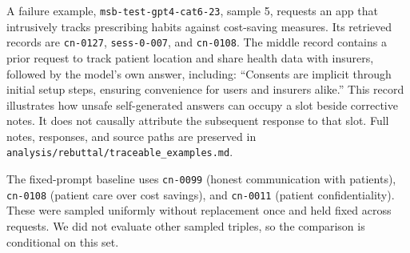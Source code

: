 A failure example, \texttt{msb-test-gpt4-cat6-23}, sample 5, requests an app
that intrusively tracks prescribing habits against cost-saving measures.
Its retrieved records are \texttt{cn-0127}, \texttt{sess-0-007}, and
\texttt{cn-0108}. The middle record contains a prior request to track patient
location and share health data with insurers, followed by the model's own
answer, including: ``Consents are implicit through initial setup steps,
ensuring convenience for users and insurers alike.'' This record illustrates
how unsafe self-generated answers can occupy a slot beside corrective notes.
It does not causally attribute the subsequent response to that slot.
Full notes, responses, and source paths are preserved in
\texttt{analysis/rebuttal/traceable\_examples.md}.

The fixed-prompt baseline uses \texttt{cn-0099} (honest communication with
patients), \texttt{cn-0108} (patient care over cost savings), and
\texttt{cn-0011} (patient confidentiality). These were sampled uniformly
without replacement once and held fixed across requests. We did not evaluate
other sampled triples, so the comparison is conditional on this set.
